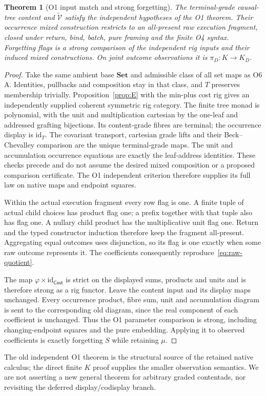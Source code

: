 \documentclass[11pt,a4paper]{article}
\newtheorem{theorem}{Theorem}[section]
\theoremstyle{definition}
\newcommand{\Set}{\mathbf{Set}}
\newcommand{\Cost}{\mathsf{Cost}}
\newcommand{\id}{\mathrm{id}}
\begin{document}
\begin{theorem}[O1 input match and strong forgetting]\label{thm:O1-input}
The terminal-grade causal-tree content and
$\widetilde{\mathcal V}$ satisfy the independent hypotheses of the
O1 theorem. Their occurrence mixed construction restricts to an
all-present raw execution fragment, closed under return, bind, batch,
pure framing and the finite O4 syntax. Forgetting flags is a strong
comparison of the independent rig inputs and their induced mixed
constructions. On joint outcome observations it is
$\pi_D:K\to K_D$.
\end{theorem}
\begin{proof}
Take the same ambient base $\Set$ and admissible class of all set maps
as O6 A. Identities, pullbacks and composition stay in that class, and
$T$ preserves membership trivially. Proposition~\ref{prop:E} with the
min-plus cost rig gives an independently supplied coherent symmetric rig
category. The finite tree monad is polynomial, with the unit and
multiplication cartesian by the one-leaf and addressed grafting
bijections. Its content-grade fibres are terminal; the occurrence display
is $\id_T$. The covariant transport, cartesian grade lifts and their
Beck--Chevalley comparison are the unique terminal-grade maps. The unit
and accumulation occurrence equations are exactly the leaf-address
identities. These checks precede and do not assume the desired mixed
composition or a proposed comparison certificate. The O1 independent
criterion therefore supplies its full law on native maps and endpoint
squares.

Within the actual execution fragment every row flag is one. A finite
tuple of actual child choices has product flag one; a prefix together
with that tuple also has flag one. A nullary child product has the
multiplicative unit flag one. Return and the typed constructor induction
therefore keep the fragment all-present. Aggregating equal outcomes uses
disjunction, so its flag is one exactly when some raw outcome represents
it. The coefficients consequently reproduce~\eqref{eq:raw-quotient}.

The map $\varphi\times\id_{\Cost}$ is strict on the displayed sums,
products and units and is therefore strong as a rig functor. Leave the
content input and its display maps unchanged. Every occurrence product,
fibre sum, unit and accumulation diagram is sent to the corresponding
old diagram, since the real component of each coefficient is unchanged.
Thus the O1 parameter comparison is strong, including changing-endpoint
squares and the pure embedding. Applying it to observed coefficients
is exactly forgetting $S$ while retaining $\mu$.
\end{proof}
The old independent O1 theorem is the structural source of the retained
native calculus; the direct finite $K$ proof supplies the smaller
observation semantics. We are not asserting a new general theorem for
arbitrary graded contentads, nor revisiting the deferred display/codisplay
branch.
\end{document}
